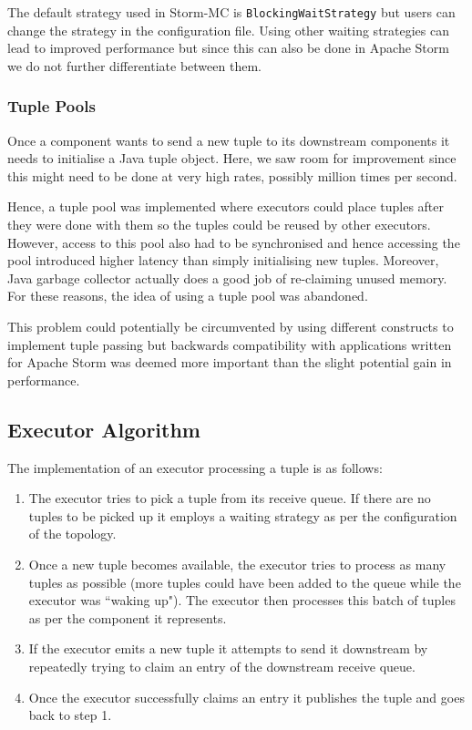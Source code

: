 \documentclass[bsc,deptreport,twoside,singlespacing,normalheadings,parskip]{infthesis}\usepackage[]{graphicx}\usepackage[]{color}
\begin{document}
The default strategy used in Storm-MC is \texttt{BlockingWaitStrategy} but users can change the strategy in the configuration file. Using other waiting strategies can lead to improved performance but since this can also be done in Apache Storm we do not further differentiate between them.

\subsubsection{Tuple Pools}

Once a component wants to send a new tuple to its downstream components it needs to initialise a Java tuple object. Here, we saw room for improvement since this might need to be done at very high rates, possibly million times per second.

Hence, a tuple pool was implemented where executors could place tuples after they were done with them so the tuples could be reused by other executors. However, access to this pool also had to be synchronised and hence accessing the pool introduced higher latency than simply initialising new tuples. Moreover, Java garbage collector actually does a good job of re-claiming unused memory. For these reasons, the idea of using a tuple pool was abandoned.

This problem could potentially be circumvented by using different constructs to implement tuple passing but backwards compatibility with applications written for Apache Storm was deemed more important than the slight potential gain in performance.

\subsection{Executor Algorithm}

The implementation of an executor processing a tuple is as follows:

\begin{enumerate}
	\item The executor tries to pick a tuple from its receive queue. If there are no tuples to be picked up it employs a waiting strategy as per the configuration of the topology.
	\item Once a new tuple becomes available, the executor tries to process as many tuples as possible (more tuples could have been added to the queue while the executor was ``waking up"). The executor then processes this batch of tuples as per the component it represents.
	\item If the executor emits a new tuple it attempts to send it downstream by repeatedly trying to claim an entry of the downstream receive queue.
	\item Once the executor successfully claims an entry it publishes the tuple and goes back to step 1.
\end{enumerate}
\end{document}
